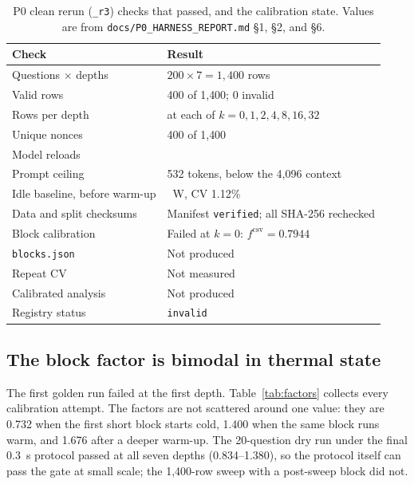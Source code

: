 \begin{table}[pos=htbp]
  \centering
  \caption{P0 clean rerun (\texttt{\_r3}) checks that passed, and the calibration state. Values
  are from \texttt{docs/P0\_HARNESS\_REPORT.md} \S1, \S2, and \S6.}
  \label{tab:p0pass}
  \small
  \begin{tabularx}{\textwidth}{>{\raggedright\arraybackslash}p{6.2cm}>{\raggedright\arraybackslash}X}
    \toprule
    \textbf{Check} & \textbf{Result} \\
    \midrule
    Questions $\times$ depths & $200\times7=1{,}400$ rows \\
    Valid rows & 1{,}400 of 1{,}400; 0 invalid \\
    Rows per depth & 200 at each of $k=0,1,2,4,8,16,32$ \\
    Unique nonces & 1{,}400 of 1{,}400 \\
    Model reloads & 0 \\
    Prompt ceiling & 3{,}532 tokens, below the 4{,}096 context \\
    Idle baseline, before warm-up & 15.573~W, CV 1.12\% \\
    Data and split checksums & Manifest \texttt{verified}; all SHA-256 rechecked \\
    Block calibration & Failed at $k=0$: $f^{\mathrm{csv}}=0.7944$ \\
    \texttt{blocks.json} & Not produced \\
    Repeat CV & Not measured \\
    Calibrated analysis & Not produced \\
    Registry status & \texttt{invalid} \\
    \bottomrule
  \end{tabularx}
\end{table}

\subsection{The block factor is bimodal in thermal state}

The first golden run failed at the first depth. Table~\ref{tab:factors} collects every
calibration attempt. The factors are not scattered around one value: they are 0.732 when the
first short block starts cold, 1.400 when the same block runs warm, and 1.676 after a deeper
warm-up. The 20-question dry run under the final 0.3~s protocol passed at all seven depths
(0.834--1.380), so the protocol itself can pass the gate at small scale; the 1{,}400-row sweep
with a post-sweep block did not.

